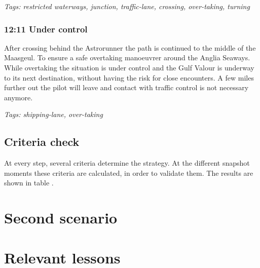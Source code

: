 \emph{Tags: restricted waterways, junction, traffic-lane, crossing, over-taking, turning}

\subsubsection{12:11 Under control}
After crossing behind the Astrorunner the path is continued to the middle of the Maasgeul. To ensure a safe overtaking manoeuvrer around the Anglia Seaways. While overtaking the situation is under control and the Gulf Valour is underway to its next destination, without having the risk for close encounters. A few miles further out the pilot will leave and contact with traffic control is not necessary anymore.

\emph{Tags: shipping-lane, over-taking}

\subsection{Criteria check}
At every step, several criteria determine the strategy. At the different snapshot moments these criteria are calculated, in order to validate them. The results are shown in table .


\section{Second scenario}

\section{Relevant lessons}
